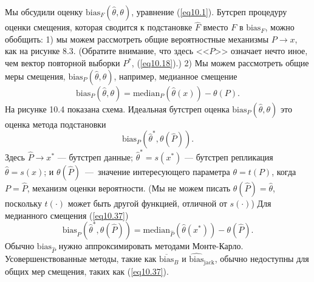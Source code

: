 Мы обсудили оценку $\text{bias}_{F}(\hat{\theta}, \theta)$, уравнение (\ref{eq10.1}). Бутсреп процедуру оценки смещения, которая сводится к подстановке $\hat{F}$ вместо $F$ в $\text{bias}_{F}$, можно обобщить: 1) мы можем рассмотреть общие вероятностные механизмы $P \rightarrow x$, как на рисунке 8.3. (Обратите внимание, что здесь <<$P$>> означает нечто иное, чем вектор повторной выборки $P^{*}$, (\ref{eq10.18}).) 2) Мы можем рассмотреть общие меры смещения, $\text{bias}_{P}(\hat{\theta}, \theta)$, например, медианное смещение
\begin{equation}\label{eq10.37}
   \text{bias}_{P}(\hat{\theta}, \theta) = \text{median}_{P}(\hat{\theta}(x)) - \theta(P).
\end{equation}
На рисунке 10.4 показана схема. Идеальная бутстреп оценка $\text{bias}_{P}(\hat{\theta}, \theta)$ это оценка метода подстановки
\begin{equation}\label{eq10.38}
   \text{bias}_{P}(\hat{\theta}^{*}, \theta(\hat{P})).
\end{equation}
Здесь $\hat{P} \rightarrow x^{*}$ --- бутстреп данные; $\hat{\theta}^{*} = s(x^{*})$ --- бутстреп репликация $\hat{\theta} = s(x)$; и $\theta(\hat{P})$~---~значение интересующего параметра $\theta = t(P)$, когда $P=\hat{P}$, механизм оценки вероятности. (Мы не можем писать $\theta(\hat{P}) = \hat{\theta}$, поскольку $t(\cdot)$ может быть другой функцией, отличной от $s(\cdot)$) Для медианного смещения (\ref{eq10.37})
\begin{equation}\label{eq10.39}
   \text{bias}_{\hat{P}}(\hat{\theta}^{*}, \theta(\hat{P})) = \text{median}_{\hat{P}}(\hat{\theta}(x^{*})) - \theta(\hat{P}).
\end{equation}
Обычно $\text{bias}_{\hat{P}}$ нужно аппроксимировать методами Монте-Карло. Усовершенствованные методы, такие как $\overline{\text{bias}}_{B}$ и $\widehat{\text{bias}}_{\text{jack}}$, обычно недоступны для общих мер смещения, таких как (\ref{eq10.37}).